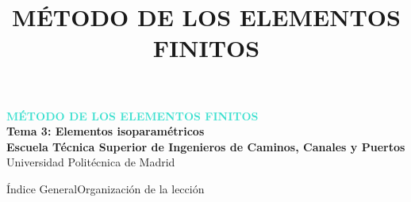 \documentclass[10pt, aspectratio=43]{beamer}
\title[Elementos isoparamétricos]{MÉTODO DE LOS ELEMENTOS FINITOS}
\institute{Universidad Politécnica de Madrid}
\date{}
\begin{document}
\begin{frame}
  \vfill
  \begin{uicard}[borderline north={4.5pt}{0pt}{DarkSlate}, left=16pt, right=16pt, top=22pt, bottom=22pt]
    \centering
    \vspace{0.2cm}
    {\large\bfseries \textcolor{Turquoise}{MÉTODO DE LOS ELEMENTOS FINITOS}}\\[0.7cm]
    
    {\Large \textcolor{DarkSlate}{\textbf{Tema 3: Elementos isoparamétricos}}}\\[1.1cm]
    
    {\small \textcolor{TextDark!85}{\textbf{Escuela Técnica Superior de Ingenieros de Caminos, Canales y Puertos}}}\\[0.15cm]
    \textcolor{TextDark!65}{\footnotesize Universidad Politécnica de Madrid}
    \vspace{0.2cm}
  \end{uicard}
  \vfill
\end{frame}

\begin{frame}{Índice General}{Organización de la lección}
  \tableofcontents
\end{frame}


\end{document}
